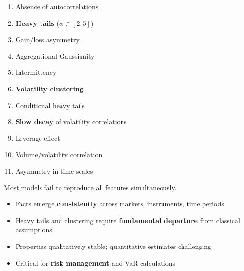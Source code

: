 \documentclass[final]{beamer}
\begin{document}
\begin{frame}[t]
\begin{columns}[t]
\begin{column}{.48\linewidth}
\begin{tcolorbox}[mybox, title=The 11 Stylized Facts]
\large
\begin{enumerate}
\item Absence of autocorrelations
\item \textbf{Heavy tails} ($\alpha \in [2,5]$)
\item Gain/loss asymmetry
\item Aggregational Gaussianity
\item Intermittency
\item \textbf{Volatility clustering}
\item Conditional heavy tails
\item \textbf{Slow decay} of volatility correlations
\item Leverage effect
\item Volume/volatility correlation
\item Asymmetry in time scales
\end{enumerate}

\vspace{0.2cm}
Most models fail to reproduce all features simultaneously.
\end{tcolorbox}

\vspace{0.5cm}

\begin{tcolorbox}[mybox, title=Results \& Conclusions]
\large
\begin{itemize}
\item Facts emerge \textbf{consistently} across markets, instruments, time periods
\item Heavy tails and clustering require \textbf{fundamental departure} from classical assumptions
\item Properties qualitatively stable; quantitative estimates challenging
\item Critical for \textbf{risk management} and VaR calculations
\end{itemize}
\end{tcolorbox}

\end{column}
\end{columns}

\vspace{0.6cm}


\end{frame}
\end{document}
